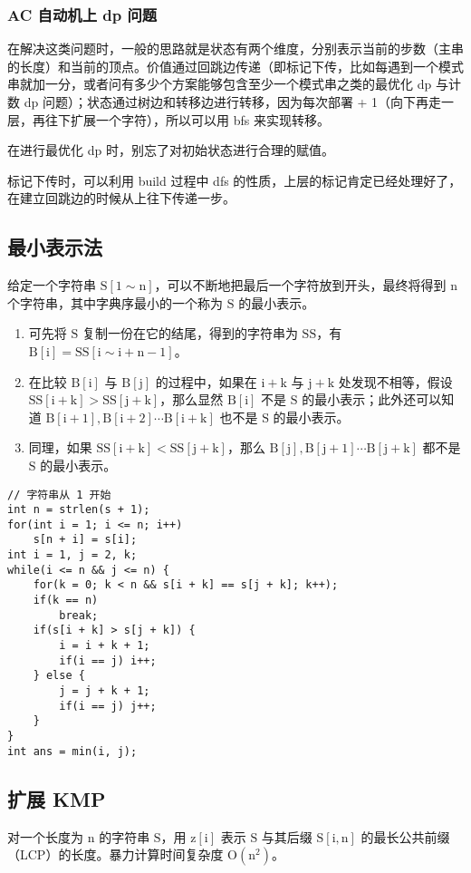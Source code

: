 \documentclass[UTF8]{article}
\begin{document}
\subsubsection{AC 自动机上 dp 问题}
在解决这类问题时，一般的思路就是状态有两个维度，分别表示当前的步数（主串的长度）和当前的顶点。价值通过回跳边传递（即标记下传，比如每遇到一个模式串就加一分，或者问有多少个方案能够包含至少一个模式串之类的最优化 dp 与计数 dp 问题）；状态通过树边和转移边进行转移，因为每次部署 + 1（向下再走一层，再往下扩展一个字符），所以可以用 bfs 来实现转移。

在进行最优化 dp 时，别忘了对初始状态进行合理的赋值。

标记下传时，可以利用 build 过程中 dfs 的性质，上层的标记肯定已经处理好了，在建立回跳边的时候从上往下传递一步。


\subsection{最小表示法}
给定一个字符串 $\mathrm{S[1 \sim n]}$，可以不断地把最后一个字符放到开头，最终将得到 $\mathrm{n}$ 个字符串，其中字典序最小的一个称为  $\mathrm{S}$ 的最小表示。

\begin{enumerate}
	\item 可先将 $\mathrm{S}$ 复制一份在它的结尾，得到的字符串为 $\mathrm{SS}$，有 $\mathrm{B[i] = SS[i \sim i + n - 1]}$。		
	\item 在比较 $\mathrm{B[i]}$ 与 $\mathrm{B[j]}$ 的过程中，如果在 $\mathrm{i+k}$ 与 $\mathrm{j+k}$ 处发现不相等，假设 $\mathrm{SS[i+k] > SS[j+k]}$，那么显然 $\mathrm{B[i]}$ 不是 $\mathrm{S}$ 的最小表示；此外还可以知道 $\mathrm{B[i+1], B[i+2] \cdots B[i + k]}$ 也不是 $\mathrm{S}$ 的最小表示。
	\item 同理，如果 $\mathrm{SS[i+k] < SS[j + k]}$，那么 $\mathrm{B[j], B[j + 1] \cdots B[j+k]}$ 都不是 $\mathrm{S}$ 的最小表示。
\end{enumerate}

\begin{lstlisting}[caption=最小表示法]
// 字符串从 1 开始
int n = strlen(s + 1);
for(int i = 1; i <= n; i++)
	s[n + i] = s[i];
int i = 1, j = 2, k;
while(i <= n && j <= n) {
	for(k = 0; k < n && s[i + k] == s[j + k]; k++);
	if(k == n)
		break;
	if(s[i + k] > s[j + k]) {
		i = i + k + 1;
		if(i == j) i++;
	} else {
		j = j + k + 1;
		if(i == j) j++;
	}
}
int ans = min(i, j);
\end{lstlisting}

\subsection{扩展 KMP}
对一个长度为 $\mathrm{n}$ 的字符串 $\mathrm{S}$，用 $\mathrm{z[i]}$ 表示 $\mathrm{S}$ 与其后缀 $\mathrm{S[i, n]}$ 的最长公共前缀（LCP）的长度。暴力计算时间复杂度 $\mathrm{O(n^2)}$。
\end{document}
